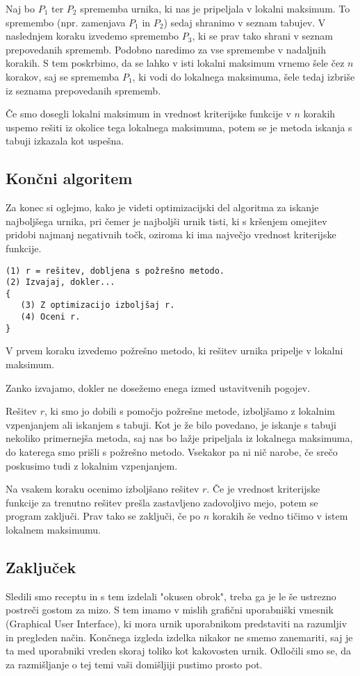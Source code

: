\documentclass[a4paper,10pt]{article}
\begin{document}
Naj bo \(P_1\) ter \(P_2\) sprememba urnika, ki nas je pripeljala v lokalni maksimum. To spremembo (npr. zamenjava \(P_1\) in \(P_2\)) sedaj shranimo v seznam tabujev. V naslednjem koraku izvedemo spremembo \(P_3\), ki se prav tako shrani v seznam prepovedanih sprememb. Podobno naredimo za vse spremembe v nadaljnih korakih. S tem poskrbimo, da se lahko v isti lokalni maksimum vrnemo šele čez \(n\) korakov, saj se sprememba \(P_1\), ki vodi do lokalnega maksimuma, šele tedaj izbriše iz seznama prepovedanih sprememb.

Če smo dosegli lokalni maksimum in vrednost kriterijske funkcije v \(n\) korakih uspemo rešiti iz okolice tega lokalnega maksimuma, potem se je metoda iskanja s tabuji izkazala kot uspešna.
\subsection{Končni algoritem}
Za konec si oglejmo, kako je videti optimizacijski del algoritma za iskanje najboljšega urnika, pri čemer je najboljši urnik tisti, ki s kršenjem omejitev pridobi najmanj negativnih točk, oziroma ki ima največjo vrednost kriterijske funkcije.

\begin{verbatim}
(1) r = rešitev, dobljena s požrešno metodo.
(2) Izvajaj, dokler...
{
   (3) Z optimizacijo izboljšaj r.
   (4) Oceni r.
}
\end{verbatim}

V prvem koraku izvedemo požrešno metodo, ki rešitev urnika pripelje v lokalni maksimum.

Zanko izvajamo, dokler ne dosežemo enega izmed ustavitvenih pogojev.

Rešitev \(r\), ki smo jo dobili s pomočjo požrešne metode, izboljšamo z lokalnim vzpenjanjem ali iskanjem s tabuji. Kot je že bilo povedano, je iskanje s tabuji nekoliko primernejša metoda, saj nas bo lažje pripeljala iz lokalnega maksimuma, do katerega smo prišli s požrešno metodo. Vsekakor pa ni nič narobe, če srečo poskusimo tudi z lokalnim vzpenjanjem.

Na vsakem koraku ocenimo izboljšano rešitev \(r\). Če je vrednost kriterijske funkcije za trenutno rešitev prešla zastavljeno zadovoljivo mejo, potem se program zaključi. Prav tako se zaključi, če po \(n\) korakih še vedno tičimo v istem lokalnem maksimumu.
\subsection{Zaključek}
Sledili smo receptu in s tem izdelali "okusen obrok", treba ga je le še ustrezno postreči gostom za mizo. S tem imamo v mislih grafični uporabniški vmesnik (Graphical User Interface), ki mora urnik uporabnikom predstaviti na razumljiv in pregleden način. Končnega izgleda izdelka nikakor ne smemo zanemariti, saj je ta med uporabniki vreden skoraj toliko kot kakovosten urnik. Odločili smo se, da za razmišljanje o tej temi vaši domišljiji pustimo prosto pot.
\end{document}
